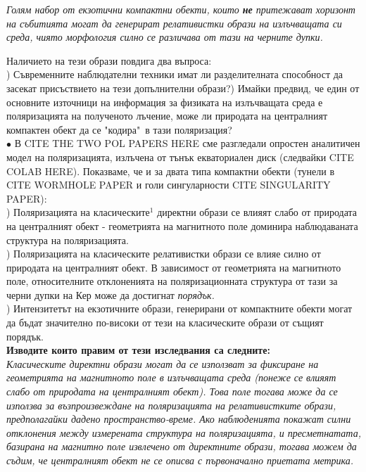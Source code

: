 \emph{Голям набор от екзотични компактни обекти, които \textbf{не} притежават хоризонт на събитията могат да генерират релативистки образи на излъчващата си среда, чиято морфология силно се различава от тази на черните дупки.}
\newpage

Наличието на тези образи повдига два въпроса:\\) Съвременните наблюдателни техники имат ли разделителната способност да засекат присъствието на тези допълнителни образи?) Имайки предвид, че един от основните източници на информация за физиката на излъчващата среда е поляризацията на полученото лъчение, може ли природата на централният компактен обект да се "кодира"$\,$ в тази поляризация?\\\newline
$\bullet$ В CITE THE TWO POL PAPERS HERE сме разгледали опростен аналитичен модел на поляризацията, излъчена от тънък екваториален диск (следвайки CITE COLAB HERE). Показваме, че и за двата типа компактни обекти (тунели в CITE WORMHOLE PAPER и голи сингуларности CITE SINGULARITY PAPER):\\) Поляризацията на класическите$^1$ директни образи се влияят слабо от природата на централният обект - геометрията на магнитното поле доминира наблюдаваната структура на поляризацията.\\) Поляризацията на класическите релативистки образи се влияе силно от природата на централният обект. В зависимост от геометрията на магнитното поле, относителните отклоненията на поляризационната структура от тази за черни дупки на Кер може да достигнат 
\emph{порядък.}\\) Интензитетът на екзотичните образи, генерирани от компактните обекти могат да бъдат значително по-високи от тези на класическите образи от същият порядък.\\\newline
\textbf{Изводите които правим от тези изследвания са следните:}\\
\emph{Класическите директни образи могат да се използват за фиксиране на геометрията на магнитното поле в излъчващата среда (понеже се влияят слабо от природата на централният обект). Това поле тогава може да се използва за възпроизвеждане на поляризацията на релативистките образи, предполагайки дадено пространство-време. Ако наблюденията покажат силни отклонения между измерената структура на поляризацията, и пресметнатата, базирана на магнитно поле извлечено от директните образи, тогава можем да съдим, че централният обект не се описва с първоначално приетата метрика.}\\\newline
